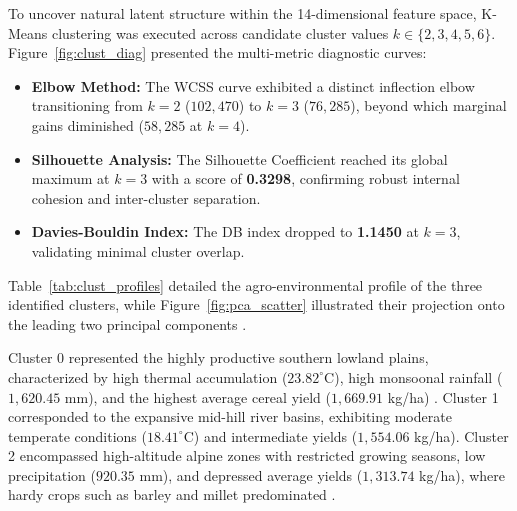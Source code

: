 \documentclass[conference]{IEEEtran}
\begin{document}
To uncover natural latent structure within the 14-dimensional feature space, K-Means clustering \cite{macqueen1967} was executed across candidate cluster values $k \in \{2, 3, 4, 5, 6\}$. Figure~\ref{fig:clust_diag} presented the multi-metric diagnostic curves:
\begin{itemize}
    \item \textbf{Elbow Method:} The WCSS curve \cite{macqueen1967} exhibited a distinct inflection elbow transitioning from $k=2$ ($102,470$) to $k=3$ ($76,285$), beyond which marginal gains diminished ($58,285$ at $k=4$).
    \item \textbf{Silhouette Analysis:} The Silhouette Coefficient \cite{rousseeuw1987} reached its global maximum at $k=3$ with a score of \textbf{0.3298}, confirming robust internal cohesion and inter-cluster separation.
    \item \textbf{Davies-Bouldin Index:} The DB index \cite{davies1979} dropped to \textbf{1.1450} at $k=3$, validating minimal cluster overlap.
\end{itemize}

Table~\ref{tab:clust_profiles} detailed the agro-environmental profile of the three identified clusters, while Figure~\ref{fig:pca_scatter} illustrated their projection onto the leading two principal components \cite{hotelling1933}.

\begin{table}[h]
\centering
\caption{Agro-Climatic Cluster Profiles ($k=3$ Regimes)}
\label{tab:clust_profiles}
\renewcommand{\arraystretch}{1.15}
\end{table}

Cluster 0 represented the highly productive southern lowland plains, characterized by high thermal accumulation ($23.82^\circ\text{C}$), high monsoonal rainfall ($1,620.45$ mm), and the highest average cereal yield ($1,669.91$ kg/ha) \cite{fernandez2021}. Cluster 1 corresponded to the expansive mid-hill river basins, exhibiting moderate temperate conditions ($18.41^\circ\text{C}$) and intermediate yields ($1,554.06$ kg/ha). Cluster 2 encompassed high-altitude alpine zones with restricted growing seasons, low precipitation ($920.35$ mm), and depressed average yields ($1,313.74$ kg/ha), where hardy crops such as barley and millet predominated \cite{dhakal2023}.
\end{document}
